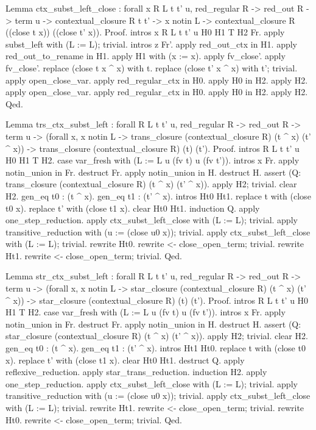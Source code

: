 \documentclass[12pt]{report}
\begin{document}
Lemma ctx\_subst\_left\_close : forall x R L t t' u, red\_regular R -> red\_out R -> term u ->
                         contextual\_closure R t t' -> x notin L ->
                         contextual\_closure R ((close t x)) ((close t' x)).
Proof.
 intros x R L t t' u H0 H1 T H2 Fr.
 apply subst\_left with (L := L); trivial. intros z Fr'. 
 apply red\_out\_ctx in H1. apply red\_out\_to\_rename in H1.
 apply H1 with (x := x). apply fv\_close'. apply fv\_close'.
 replace (close t x \^{} x) with t. replace (close t' x \^{} x) with t'; trivial.
 apply open\_close\_var. apply red\_regular\_ctx in H0. apply H0 in H2. apply H2.
 apply open\_close\_var. apply red\_regular\_ctx in H0. apply H0 in H2. apply H2.
Qed.


Lemma trs\_ctx\_subst\_left : forall R L t t' u, red\_regular R -> red\_out R -> term u ->
                       (forall x, x notin L ->  trans\_closure (contextual\_closure R) (t \^{} x) (t' \^{} x)) ->
                       trans\_closure (contextual\_closure R) (t) (t').
Proof.
 intros R L t t' u H0 H1 T H2.  case var\_fresh with (L := L u (fv t) u (fv t')). intros x Fr.
 apply notin\_union in Fr. destruct Fr. apply notin\_union in H. destruct H.
 assert (Q: trans\_closure (contextual\_closure R) (t \^{} x) (t' \^{} x)). apply H2; trivial. clear H2.
 gen\_eq t0 : (t \^{} x). gen\_eq t1 : (t' \^{} x). intros Ht0 Ht1.
 replace t with (close t0 x). replace t' with (close t1 x). clear Ht0 Ht1. induction Q.
 apply one\_step\_reduction. apply ctx\_subst\_left\_close with (L := L); trivial.
 apply transitive\_reduction with (u := (close u0 x)); trivial.
 apply ctx\_subst\_left\_close with (L := L); trivial.
 rewrite Ht0. rewrite <- close\_open\_term; trivial. 
 rewrite Ht1. rewrite <- close\_open\_term; trivial.
Qed.


Lemma str\_ctx\_subst\_left : forall R L t t' u, red\_regular R -> red\_out R -> term u ->
                       (forall x, x notin L ->  star\_closure (contextual\_closure R) (t \^{} x) (t' \^{} x)) ->
                       star\_closure (contextual\_closure R) (t) (t').
Proof.
 intros R L t t' u H0 H1 T H2.  case var\_fresh with (L := L u (fv t) u (fv t')). intros x Fr.
 apply notin\_union in Fr. destruct Fr. apply notin\_union in H. destruct H.
 assert (Q: star\_closure (contextual\_closure R) (t \^{} x) (t' \^{} x)). apply H2; trivial. clear H2.
 gen\_eq t0 : (t \^{} x). gen\_eq t1 : (t' \^{} x). intros Ht1 Ht0.
 replace t with (close t0 x). replace t' with (close t1 x). clear Ht0 Ht1. destruct Q.
 apply reflexive\_reduction. apply star\_trans\_reduction. induction H2.
 apply one\_step\_reduction. apply ctx\_subst\_left\_close with (L := L); trivial.
 apply transitive\_reduction with (u := (close u0 x)); trivial.
 apply ctx\_subst\_left\_close with (L := L); trivial.
 rewrite Ht1. rewrite <- close\_open\_term; trivial. 
 rewrite Ht0. rewrite <- close\_open\_term; trivial.
Qed.
\end{document}
